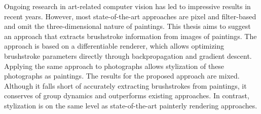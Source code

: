 Ongoing research in art-related computer vision has led to impressive results in recent years.
However, most state-of-the-art approaches are pixel and filter-based and omit the three-dimensional nature of paintings.
This thesis aims to suggest an approach that extracts brushstroke information from images of paintings.
The approach is based on a differentiable renderer, which allows optimizing brushstroke parameters directly through backpropagation and gradient descent.
Applying the same approach to photographs allows stylization of these photographs as paintings.
The results for the proposed approach are mixed.
Although it falls short of accurately extracting brushstrokes from paintings, it conserves of group dynamics and outperforms existing approaches.
In contrast, stylization is on the same level as state-of-the-art painterly rendering approaches.
